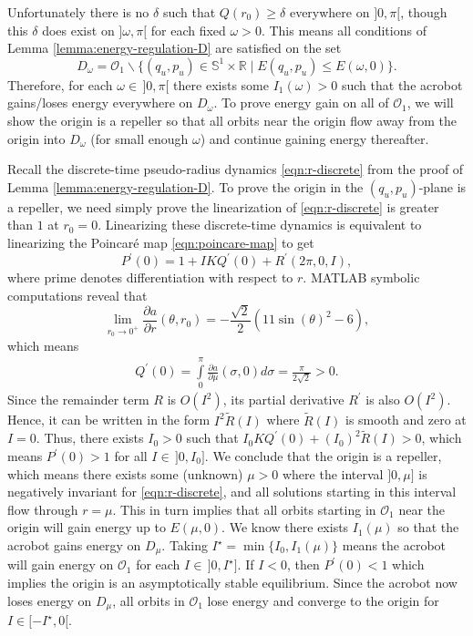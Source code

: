 \documentclass[journal,twoside,web]{ieeecolor}
\newcommand*{\R}{\mathbb{R}}
\newcommand*{\Sone}{\mathbb{S}^1}
\newcommand*{\SxR}{\Sone \times \R}
\newcommand*{\pdiff}[2]{\frac{\partial #1}{\partial #2}}
\begin{document}
{Unfortunately there is no \(\delta\) such that \(Q(r_0) \geq \delta\)
everywhere on \(]0,\pi[\), though this \(\delta\) does exist 
on \(]\omega,\pi[\) for each fixed \(\omega > 0\).
This means all conditions of Lemma \ref{lemma:energy-regulation-D}
are satisfied on the set 
\[
    D_\omega = \mathcal{O}_1 \backslash 
    \{(q_u,p_u) \in \SxR \mid E(q_u,p_u) \leq E(\omega,0)\}
    .
\]
Therefore, for each \(\omega \in \, ]0,\pi[\) there exists some 
\(I_1(\omega) > 0\) such that the acrobot gains/loses energy everywhere on
\(D_\omega\).
To prove energy gain on all of \(\mathcal{O}_1\), we will show the origin is a
repeller so that all orbits near the origin flow away from the origin into
\(D_\omega\) (for small enough \(\omega\)) and continue gaining energy
thereafter.

Recall the discrete-time pseudo-radius dynamics \eqref{eqn:r-discrete} from the
proof of Lemma \ref{lemma:energy-regulation-D}. 
To prove the origin in the \((q_u,p_u)\)-plane is a repeller, we need simply
prove the linearization of \eqref{eqn:r-discrete} is greater than \(1\) at 
\(r_0 = 0\).
Linearizing these discrete-time dynamics is equivalent to linearizing the
Poincar\'{e} map \eqref{eqn:poincare-map} to get
\[
    P^\prime(0) = 1 + I K Q^\prime(0) + R^\prime(2\pi,0,I)
    ,
\]
where prime denotes differentiation with respect to \(r\).
MATLAB symbolic computations reveal that
\begin{equation*}
    \lim \limits_{r_0 \to 0^+}
    \pdiff{a}{r}(\theta,r_0) 
    = -\frac{\sqrt{2}}{2} \left(11\sin(\theta)^2 - 6\right)
    ,
\end{equation*}
which means
\begin{align*}
    Q^\prime(0) = \int \limits_0^\pi \pdiff{a}{\mu}(\sigma,0) d\sigma
    = \frac{\pi}{2\sqrt{2}} > 0
    .
\end{align*}
Since the remainder term \(R\) is \(O(I^2)\), its partial derivative 
\(R^\prime\) is also \(O(I^2)\).
Hence, it can be written in the form
\(I^2 \tilde{R}(I)\) where \(\tilde{R}(I)\) is smooth and zero at \(I = 0\).
Thus, there exists \(I_0 > 0\) such that 
\(I_0 K Q^\prime(0) + (I_0)^2 \tilde{R}(I) > 0\), which means
\(P^\prime(0) > 1\) for all \(I \in \, ]0, I_0]\).
We conclude that the origin is a repeller, which means there exists some
(unknown) \(\mu > 0\) where the interval \(]0,\mu]\) is negatively
invariant for \eqref{eqn:r-discrete}, and all solutions starting in this
interval flow through \(r = \mu\).
This in turn implies that all orbits starting in \(\mathcal{O}_1\) near the
origin will gain energy up to \(E(\mu,0)\).
We know there exists \(I_1(\mu)\) so that the acrobot gains energy on \(D_\mu\).
Taking \(I^\star = \min\{I_0,I_1(\mu)\}\) means the acrobot will gain energy on
\(\mathcal{O}_1\) for each \(I \in \, ]0,I^\star]\).
If \(I < 0\), then \(P^\prime(0) < 1\) which implies the origin is an
asymptotically stable equilibrium.
Since the acrobot now loses energy on \(D_\mu\), all orbits in \(\mathcal{O}_1\)
lose energy and converge to the origin for \(I \in [-I^\star,0[\).

}
\end{document}
